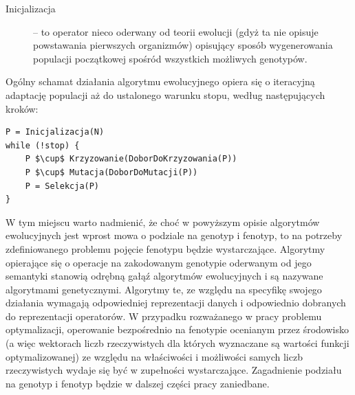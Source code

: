 \documentclass[11pt,a4paper]{report}
\begin{document}
{{{\begin{description}
  \item[Inicjalizacja] -- to operator nieco oderwany od teorii ewolucji (gdyż ta nie opisuje powstawania pierwszych organizmów) opisujący sposób wygenerowania populacji początkowej spośród wszystkich możliwych genotypów.
\end{description}
}
\newpage
\par{
Ogólny schamat działania algorytmu ewolucyjnego opiera się o iteracyjną adaptację populacji aż do ustalonego warunku stopu, według następujących kroków:
\lstset{language=C}
\begin{lstlisting}[frame=single,mathescape]
P = Inicjalizacja(N)
while (!stop) {
	P $\cup$ Krzyzowanie(DoborDoKrzyzowania(P))
	P $\cup$ Mutacja(DoborDoMutacji(P))
	P = Selekcja(P)
}
\end{lstlisting}
}
\par{
W tym miejscu warto nadmienić, że choć w powyższym opisie algorytmów ewolucyjnych jest wprost mowa o podziale na genotyp i fenotyp, to na potrzeby zdefiniowanego problemu pojęcie fenotypu będzie wystarczające. Algorytmy opierające się o operacje na zakodowanym genotypie oderwanym od jego semantyki stanowią odrębną gałąź algorytmów ewolucyjnych i są nazywane algorytmami genetycznymi. Algorytmy te, ze względu na specyfikę swojego działania wymagają odpowiedniej reprezentacji danych i odpowiednio dobranych do reprezentacji operatorów. W przypadku rozważanego w pracy problemu optymalizacji, operowanie bezpośrednio na fenotypie ocenianym przez środowisko (a więc wektorach liczb rzeczywistych dla których wyznaczane są wartości funkcji optymalizowanej) ze względu na właściwości i możliwości samych liczb rzeczywistych wydaje się być w zupełności wystarczające. Zagadnienie podziału na genotyp i fenotyp będzie w dalszej części pracy zaniedbane.
}
}}
\end{document}
